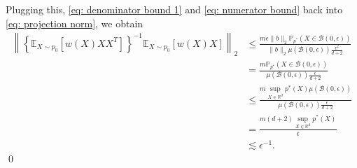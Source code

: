 \documentclass[11pt]{article}
\begin{document}
Plugging this, \cref{eq: denominator bound 1} and \cref{eq: numerator bound} back into \cref{eq: projection norm}, we obtain
\begin{align*}
    \left\|\left\{\mathbb{E}_{X\sim p_0}[w(X)XX^{T}]\right\}^{-1}\mathbb{E}_{X \sim p_0}[w(X)X]\right\|_2 &\leq \frac{m\epsilon\|b\|_2\mathbb{P}_{p^*}(X \in \mathcal{B}(0, \epsilon))}{\|b\|_2\mu\left(\mathcal{B}(0, \epsilon)\right) \frac{\epsilon^2}{d+2}} \\
    &= \frac{m\mathbb{P}_{p^*}(X \in \mathcal{B}(0, \epsilon))}{\mu\left(\mathcal{B}(0, \epsilon)\right) \frac{\epsilon}{d+2}} \\
    &\leq \frac{m\sup_{X\in \mathbb{R}^d}p^*(X) \mu\left(\mathcal{B}(0, \epsilon)\right)}{\mu\left(\mathcal{B}(0, \epsilon)\right) \frac{\epsilon }{d+2}} \\
    &= \frac{m(d+2)\sup_{X\in \mathbb{R}^d}p^*(X)}{ \epsilon } \\
    &\lesssim \epsilon^{-1}.
\end{align*}
\qed{}
\end{document}
